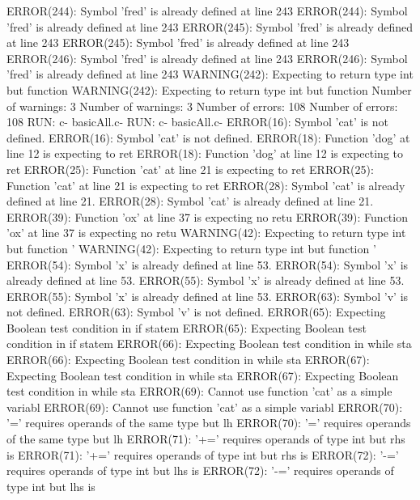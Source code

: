 \documentclass[12pt]{book}
\begin{document}
ERROR(244): Symbol 'fred' is already defined at line 243        ERROR(244): Symbol 'fred' is already defined at line 243
ERROR(245): Symbol 'fred' is already defined at line 243        ERROR(245): Symbol 'fred' is already defined at line 243
ERROR(246): Symbol 'fred' is already defined at line 243        ERROR(246): Symbol 'fred' is already defined at line 243
WARNING(242): Expecting to return type int but function         WARNING(242): Expecting to return type int but function 
Number of warnings: 3                                                Number of warnings: 3
Number of errors: 108                                                Number of errors: 108
RUN: c- basicAll.c-                                                RUN: c- basicAll.c-
ERROR(16): Symbol 'cat' is not defined.                                ERROR(16): Symbol 'cat' is not defined.
ERROR(18): Function 'dog' at line 12 is expecting to ret        ERROR(18): Function 'dog' at line 12 is expecting to ret
ERROR(25): Function 'cat' at line 21 is expecting to ret        ERROR(25): Function 'cat' at line 21 is expecting to ret
ERROR(28): Symbol 'cat' is already defined at line 21.                ERROR(28): Symbol 'cat' is already defined at line 21.
ERROR(39): Function 'ox' at line 37 is expecting no retu        ERROR(39): Function 'ox' at line 37 is expecting no retu
WARNING(42): Expecting to return type int but function '        WARNING(42): Expecting to return type int but function '
ERROR(54): Symbol 'x' is already defined at line 53.                ERROR(54): Symbol 'x' is already defined at line 53.
ERROR(55): Symbol 'x' is already defined at line 53.                ERROR(55): Symbol 'x' is already defined at line 53.
ERROR(63): Symbol 'v' is not defined.                                ERROR(63): Symbol 'v' is not defined.
ERROR(65): Expecting Boolean test condition in if statem        ERROR(65): Expecting Boolean test condition in if statem
ERROR(66): Expecting Boolean test condition in while sta        ERROR(66): Expecting Boolean test condition in while sta
ERROR(67): Expecting Boolean test condition in while sta        ERROR(67): Expecting Boolean test condition in while sta
ERROR(69): Cannot use function 'cat' as a simple variabl        ERROR(69): Cannot use function 'cat' as a simple variabl
ERROR(70): '=' requires operands of the same type but lh        ERROR(70): '=' requires operands of the same type but lh
ERROR(71): '+=' requires operands of type int but rhs is        ERROR(71): '+=' requires operands of type int but rhs is
ERROR(72): '-=' requires operands of type int but lhs is        ERROR(72): '-=' requires operands of type int but lhs is
\end{document}
